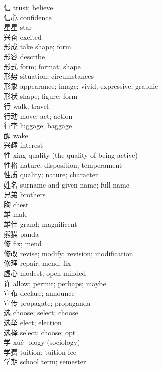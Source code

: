 信 \quad trust; believe\\
信心 \quad confidence\\
星星 \quad star\\
兴奋 \quad excited\\
形成 \quad take shape; form\\
形容 \quad describe\\
形式 \quad form; format; shape\\
形势 \quad situation; circumstances\\
形象 \quad appearance; image; vivid; expressive; graphic\\
形状 \quad shape; figure; form\\
行 \quad walk; travel\\
行动 \quad move; act; action\\
行李 \quad luggage; baggage\\
醒 \quad wake\\
兴趣 \quad interest\\
性 \quad xìng \quad quality (the quality of being active)\\
性格 \quad nature; disposition; temperament\\
性质 \quad quality; nature; character\\
姓名 \quad surname and given name; full name\\
兄弟 \quad brothers\\
胸 \quad chest\\
雄 \quad male\\
雄伟 \quad grand; magnificent\\
熊猫 \quad panda\\
修 \quad fix; mend\\
修改 \quad revise; modify; revision; modification\\
修理 \quad repair; mend; fix\\
虚心 \quad modest; open-minded\\
许 \quad allow; permit; perhaps; maybe\\
宣布 \quad declare; announce\\
宣传 \quad propagate; propaganda\\
选 \quad choose; select; choose\\
选举 \quad elect; election\\
选择 \quad select; choose; opt\\
学 \quad xué \quad -ology (sociology)\\
学费 \quad tuition; tuition fee\\
学期 \quad school term; semester\\
